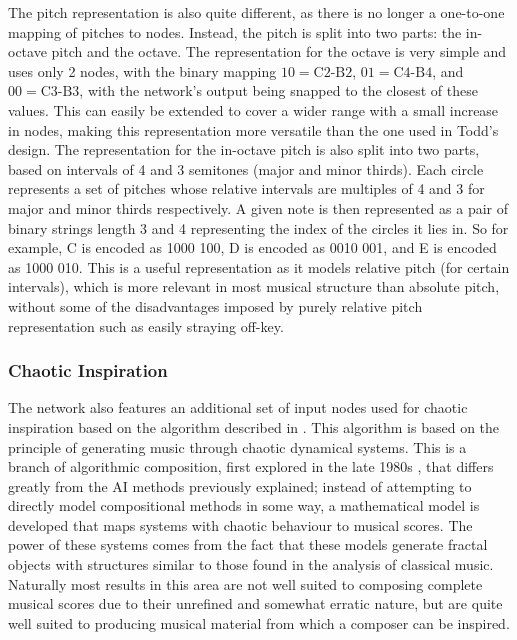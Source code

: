 \documentclass[ author={Stephen Livermore-Tozer},
				supervisor={Dr. Peter Flach},
				degree={MEng},
				title={Performing Algorithmic Co-composition Using Machine Learning},
				subtitle={},
				type={research},
				year={2016} ]{dissertation}
\begin{document}
	The pitch representation is also quite different, as there is no longer a one-to-one mapping of pitches to nodes. Instead, the pitch is split into two parts: the in-octave pitch and the octave. The representation for the octave is very simple and uses only 2 nodes, with the binary mapping $10 = \text{C2-B2}$, $01 = \text{C4-B4}$, and $00 = \text{C3-B3}$, with the network's output being snapped to the closest of these values. This can easily be extended to cover a wider range with a small increase in nodes, making this representation more versatile than the one used in Todd's design. The representation for the in-octave pitch is also split into two parts, based on intervals of 4 and 3 semitones (major and minor thirds). Each circle represents a set of pitches whose relative intervals are multiples of 4 and 3 for major and minor thirds respectively. A given note is then represented as a pair of binary strings length 3 and 4 representing the index of the circles it lies in. So for example, C is encoded as 1000 100, D is encoded as 0010 001, and E is encoded as 1000 010. This is a useful representation as it models relative pitch (for certain intervals), which is more relevant in most musical structure than absolute pitch, without some of the disadvantages imposed by purely relative pitch representation such as easily straying off-key. 
	
	\subsubsection{Chaotic Inspiration}
	\label{sec:chaotic-inspiration}
	
	The network also features an additional set of input nodes used for chaotic inspiration based on the algorithm described in \cite{coca2010characterizing}. This algorithm is based on the principle of generating music through chaotic dynamical systems. This is a branch of algorithmic composition, first explored in the late 1980s \cite{pressing1988nonlinear}, that differs greatly from the AI methods previously explained; instead of attempting to directly model compositional methods in some way, a mathematical model is developed that maps systems with chaotic behaviour to musical scores. The power of these systems comes from the fact that these models generate fractal objects with structures similar to those found in the analysis of classical music. Naturally most results in this area are not well suited to composing complete musical scores due to their unrefined and somewhat erratic nature, but are quite well suited to producing musical material from which a composer can be inspired.
	
\end{document}
